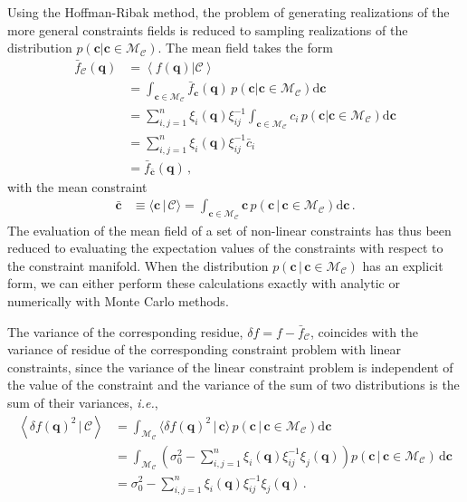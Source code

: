 \documentclass[a4paper, 11pt]{article}
\begin{document}
Using the Hoffman-Ribak method, the problem of generating realizations of the more general constraints fields is reduced to sampling realizations of the distribution $p(\bm{c}|\bm{c}\in \mathcal{M}_\mathcal{C})$. The mean field takes the form
\begin{align}
\bar{f}_{\mathcal{C}}(\bm{q}) 
&=\left\langle f(\bm{q})|\mathcal{C}\right \rangle \nonumber\\
&= \int_{\bm{c} \in \mathcal{M}_{\mathcal{C}}} \bar{f}_{\bm{c}}(\bm{q})\, p(\bm{c}|\bm{c}\in \mathcal{M}_{\mathcal{C}}) \mathrm{d}\bm{c}\nonumber\\
&= \sum_{i,j=1}^n\xi_i(\bm{q}) \xi_{ij}^{-1}\int_{\bm{c} \in \mathcal{M}_{\mathcal{C}}}  c_i\, p(\bm{c}|\bm{c}\in \mathcal{M}_{\mathcal{C}}) \mathrm{d}\bm{c}\nonumber\\
&= \sum_{i,j=1}^n \xi_i(\bm{q}) \xi_{ij}^{-1} \bar{c}_i\nonumber\\
&= \bar{f}_{\bar{\bm{c}}}(\bm{q})\,,
\end{align}
with the mean constraint
\begin{align}
\bar{\bm{c}} &\equiv \langle \bm{c} \,|\, \mathcal{C}\rangle = \int_{\bm{c} \in \mathcal{M}_{\mathcal{C}}}  \bm{c}\, p(\bm{c}\,|\,\bm{c}\in \mathcal{M}_{\mathcal{C}}) \mathrm{d}\bm{c}\,.
\end{align}
The evaluation of the mean field of a set of non-linear constraints has thus been reduced to evaluating the expectation values of the constraints with respect to the constraint manifold. When the distribution $p(\bm{c}\,|\,\bm{c}\in \mathcal{M}_{\mathcal{C}})$ has an explicit form, we can either perform these calculations exactly with analytic or numerically with Monte Carlo methods.

The variance of the corresponding residue, $\delta f = f - \bar{f}_{\mathcal{C}}$, coincides with the variance of residue of the corresponding constraint problem with linear constraints, since the variance of the linear constraint problem is independent of the value of the constraint and the variance of the sum of two distributions is the sum of their variances, \textit{i.e.},
\begin{align}
\left \langle \delta f (\bm{q})^2\,|\,\mathcal{C}\right\rangle &= \int_{\mathcal{M}_\mathcal{C}} \langle \delta f(\bm{q})^2\, |\, \bm{c}\rangle\, p(\bm{c}\,|\, \bm{c} \in \mathcal{M}_\mathcal{C})\mathrm{d}\bm{c}\nonumber\\
&=\int_{\mathcal{M}_\mathcal{C}} 
\left( \sigma_0^2 - \sum_{i,j=1}^n\xi_i(\bm{q}) \xi_{ij}^{-1} \xi_j(\bm{q})\right) p(\bm{c}\,|\,\bm{c}\in \mathcal{M}_\mathcal{C})\,\mathrm{d}\bm{c}\nonumber\\
&= \sigma_0^2 - \sum_{i,j=1}^n\xi_i(\bm{q}) \xi_{ij}^{-1} \xi_j(\bm{q})\,.
\end{align}
\end{document}

